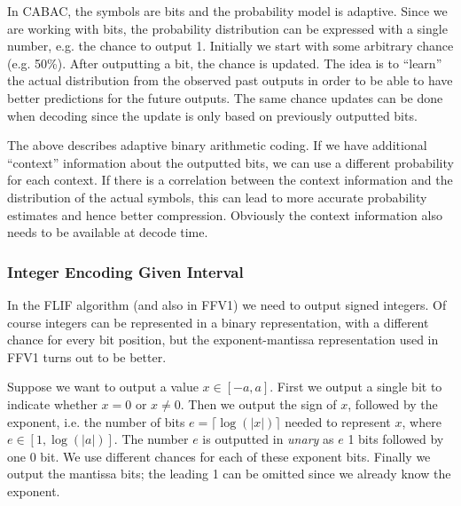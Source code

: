 \documentclass[a4paper,USenglish]{lipics}
\begin{document}
In CABAC, the symbols are bits and the probability model is adaptive.
Since we are working with bits, the probability distribution can be expressed with
a single number, e.g. the chance to output 1. Initially we start with some arbitrary
chance (e.g. 50\%).
After outputting a bit, the chance is updated. The idea is to ``learn'' the actual
distribution from the observed past outputs in order to be able to have better predictions
for the future outputs. The same chance updates can be done when decoding since the update is
only based on previously outputted bits.

The above describes adaptive binary arithmetic coding. If we have additional ``context''
information about the outputted bits, we can use a different probability for each context.
If there is a correlation between the context information and the distribution of the
actual symbols, this can lead to more accurate probability estimates and hence better compression.
Obviously the context information also needs to be available at decode time.




\subsubsection{Integer Encoding Given Interval}
\label{sec:rac:interval}

In the FLIF algorithm (and also in FFV1) we need to output signed integers.
Of course integers can be represented in a binary representation, with a different chance
for every bit position, but the exponent-mantissa representation used in FFV1 turns out
to be better.

Suppose we want to output a value $x \in [-a,a]$.
First we output a single bit to indicate whether $x = 0$ or $x \neq 0$.
Then we output the sign of $x$, followed by the exponent, i.e. the number of bits $e = \lceil \log(|x|) \rceil$ needed to
represent $x$, where $e \in [1,\log(|a|)]$.
The number $e$ is outputted in {\em unary} as $e$ 1 bits followed by one 0 bit.
We use different chances for each of these exponent bits.
Finally we output the mantissa bits; the leading 1 can be omitted since we already know the exponent.
\end{document}
